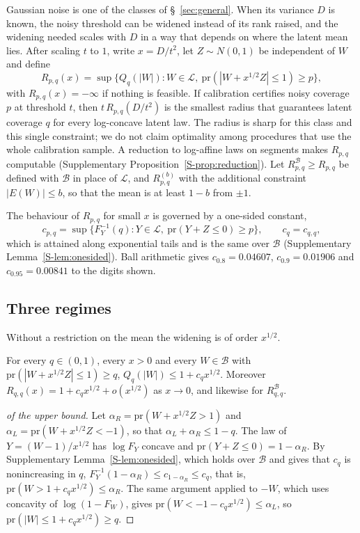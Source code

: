 \documentclass[lineno]{biometrika}
\newcommand{\pr}{\mathrm{pr}}
\newcommand{\LC}{\mathcal{L}}
\begin{document}
Gaussian noise is one of the classes of \S~\ref{sec:general}. When its variance $D$ is known, the noisy threshold can be widened instead of its rank raised, and the widening needed scales with $D$ in a way that depends on where the latent mean lies. After scaling $t$ to $1$, write $x = D/t^2$, let $Z \sim N(0,1)$ be independent of $W$ and define
\begin{equation}\label{eq:R}
R_{p,q}(x) = \sup\{ Q_q(|W|) : W \in \LC,\ \pr(|W + x^{1/2}Z| \le 1) \ge p \},
\end{equation}
with $R_{p,q}(x) = -\infty$ if nothing is feasible. If calibration certifies noisy coverage $p$ at threshold $t$, then $t\,R_{p,q}(D/t^2)$ is the smallest radius that guarantees latent coverage $q$ for every log-concave latent law. The radius is sharp for this class and this single constraint; we do not claim optimality among procedures that use the whole calibration sample. A reduction to log-affine laws on segments makes $R_{p,q}$ computable (Supplementary Proposition~\ref{S-prop:reduction}). Let $R^{\mathcal B}_{p,q} \ge R_{p,q}$ be defined with $\mathcal B$ in place of $\LC$, and $R^{(b)}_{p,q}$ with the additional constraint $|E(W)| \le b$, so that the mean is at least $1 - b$ from $\pm 1$.

The behaviour of $R_{p,q}$ for small $x$ is governed by a one-sided constant,
\[
c_{p,q} = \sup\{F_Y^{-1}(q) : Y \in \LC,\ \pr(Y + Z \le 0) \ge p\}, \qquad c_q = c_{q,q},
\]
which is attained along exponential tails and is the same over $\mathcal B$ (Supplementary Lemma~\ref{S-lem:onesided}). Ball arithmetic gives $c_{0.8} = 0.04607$, $c_{0.9} = 0.01906$ and $c_{0.95} = 0.00841$ to the digits shown.

\subsection{Three regimes}

Without a restriction on the mean the widening is of order $x^{1/2}$.

\begin{theorem}\label{thm:small}
For every $q \in (0,1)$, every $x > 0$ and every $W \in \mathcal B$ with $\pr(|W + x^{1/2}Z| \le 1) \ge q$, $Q_q(|W|) \le 1 + c_q x^{1/2}$. Moreover $R_{q,q}(x) = 1 + c_q x^{1/2} + o(x^{1/2})$ as $x \to 0$, and likewise for $R^{\mathcal B}_{q,q}$.
\end{theorem}

\begin{proof}[of the upper bound]
Let $\alpha_R = \pr(W + x^{1/2}Z > 1)$ and $\alpha_L = \pr(W + x^{1/2}Z < -1)$, so that $\alpha_L + \alpha_R \le 1 - q$. The law of $Y = (W - 1)/x^{1/2}$ has $\log F_Y$ concave and $\pr(Y + Z \le 0) = 1 - \alpha_R$. By Supplementary Lemma~\ref{S-lem:onesided}, which holds over $\mathcal B$ and gives that $c_q$ is nonincreasing in $q$, $F_Y^{-1}(1 - \alpha_R) \le c_{1-\alpha_R} \le c_q$, that is, $\pr(W > 1 + c_q x^{1/2}) \le \alpha_R$. The same argument applied to $-W$, which uses concavity of $\log(1 - F_W)$, gives $\pr(W < -1 - c_q x^{1/2}) \le \alpha_L$, so $\pr(|W| \le 1 + c_q x^{1/2}) \ge q$.
\end{proof}
\end{document}
